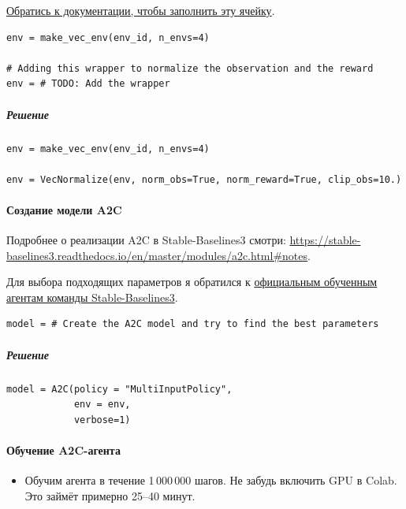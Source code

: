 \documentclass[11pt,a4paper]{article}
\begin{document}
\href{https://stable-baselines3.readthedocs.io/en/master/guide/vec_envs.html\#vecnormalize}{Обратись к документации, чтобы заполнить эту ячейку}.

\begin{lstlisting}
env = make_vec_env(env_id, n_envs=4)

# Adding this wrapper to normalize the observation and the reward
env = # TODO: Add the wrapper
\end{lstlisting}

\subparagraph{Решение}\label{solution}

\begin{lstlisting}
env = make_vec_env(env_id, n_envs=4)

env = VecNormalize(env, norm_obs=True, norm_reward=True, clip_obs=10.)
\end{lstlisting}

\paragraph{Создание модели A2C}\label{create-the-a2c-model}

Подробнее о реализации A2C в Stable-Baselines3 смотри: \url{https://stable-baselines3.readthedocs.io/en/master/modules/a2c.html#notes}.

Для выбора подходящих параметров я обратился к \href{https://huggingface.co/sb3}{официальным обученным агентам команды Stable-Baselines3}.

\begin{lstlisting}
model = # Create the A2C model and try to find the best parameters
\end{lstlisting}

\subparagraph{Решение}\label{solution-1}

\begin{lstlisting}
model = A2C(policy = "MultiInputPolicy",
            env = env,
            verbose=1)
\end{lstlisting}

\paragraph{Обучение A2C-агента}\label{train-the-a2c-agent}

\begin{itemize}
\tightlist
\item
  Обучим агента в течение 1\,000\,000 шагов. Не забудь включить GPU в Colab. Это займёт примерно 25--40 минут.
\end{itemize}
\end{document}
